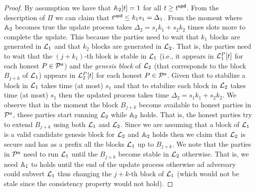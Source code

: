 \begin{proof}
By assumption we have that $\mathbb{A}_2[t]=1$ for all $t\geq t^{\mathsf{upd}}$. From the description of $\Pi$ 
we can claim that $t^{\mathsf{upd}} \leq k_1 s_1=\Delta_1$.
From the moment where $\mathbb{A}_2$ becomes true the update process takes $\Delta_2=s_1 k_1 + s_2 k_2$  times slots more to complete the update.
This because the parties need to wait that $k_1$ blocks are generated in $\mathcal{L}_1$ and that $k_2$ blocks are generated in $\mathcal{L}_2$. 
That is, the parties need to wait that the $(j+k_1)$-th block is stable in $\mathcal{L}_1$ (i.e., 
it appears in $\mathcal{L}_1^P[t]$ for each honest $P\in\mathcal{P}^\mathsf{u}$) and the \emph{genesis block} of $\mathcal{L}_2$ (that corresponds to the block $B_{j+k}$ of $\mathcal{L}_1$) appears 
in $\mathcal{L}_2^P[t]$ for each honest $P\in\mathcal{P}^\mathsf{u}$. Given that to stabilize a block in $\mathcal{L}_1$ takes time (at most) $s_1$ and that to stabilize
each block in $\mathcal{L}_2$ takes time (at most) $s_1$ then the updated process takes time $\Delta_2=s_1 k_1 + s_2 k_2$.
We observe that in the moment the block $B_{j+k}$ become available to honest parties in $\mathcal{P}^\mathsf{u}$, these parties start running $\mathcal{L}_2$ while $\mathbb{A}_2$ holds.
That is, the honest parties try to extend $B_{j+k}$ using both $\mathcal{L}_1$ and $\mathcal{L}_2$. Since we are assuming that a block of $\mathcal{L}_1$ is 
a valid candidate genesis block for $\mathcal{L}_2$ and $\mathbb{A}_2$ holds then we claim that $\mathcal{L}_2$ is secure and has as a prefix all the blocks $\mathcal{L}_1$ up to
$B_{j+k}$. We note that the parties in $\mathcal{P}^\mathsf{u}$ need to run $\mathcal{L}_1$ until the $B_{j+k}$ become stable in $\mathcal{L}_2$ otherwise. That is, we need $\mathbb{A}_1$ to
holds until the end of the update process otherwise ad adversary could subvert $\mathcal{L}_1$ thus changing the $j+k$-th block of $\mathcal{L}_1$ (which would not be stale
since the consistency property would not hold).

\end{proof}
